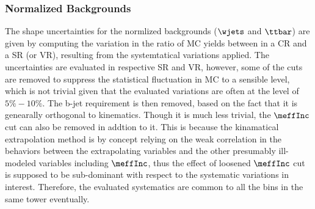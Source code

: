 \subsubsection{Normalized Backgrounds} 
%
The shape uncertainties for the normlized backgrounds ($\wjets$ and $\ttbar$) are given by computing the variation in the ratio of MC yields between in a CR and a SR (or VR), resulting from the systemtatical variations applied.
The uncertainties are evaluated in respective SR and VR, however, some of the cuts are removed to suppress the statistical fluctuation in MC to a sensible level, which is not trivial given that the evaluated variations are often at the level of $5\%-10\%$.
The b-jet requirement is then removed, based on the fact that it is genearally orthogonal to kinematics.
Though it is much less trivial, the $\meffInc$ cut can also be removed in addtion to it. 
This is because the kinamatical extrapolation method is by concept relying on the weak correlation in the behaviors between the extrapolating variables and the other presumably ill-modeled variables including $\meffInc$, thus the effect of loosened $\meffInc$ cut is supposed to be sub-dominant with respect to the systematic variations in interest.
%
Therefore, the evaluated systematics are common to all the bins in the same tower eventually. \\

